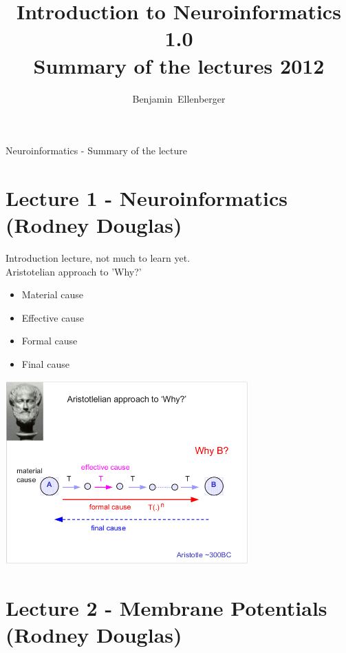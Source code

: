 \documentclass[english,11pt]{article}
\title{\textbf{Introduction to Neuroinformatics 1.0}
				\\Summary of the lectures 2012}
\author{Benjamin~Ellenberger}
\date{}
\begin{document}
\maketitle

\pagestyle{headings}
{Neuroinformatics - Summary of the lecture}


\section{Lecture 1 - Neuroinformatics (Rodney Douglas)}
Introduction lecture, not much to learn yet.
\\
Aristotelian approach to 'Why?'
\begin{itemize}
\item Material cause
\item Effective cause
\item Formal cause
\item Final cause
\end{itemize}

\includegraphics[width=0.7\textwidth]{aristothelian-why.png}

\section{Lecture 2 - Membrane Potentials (Rodney Douglas)}
\end{document}
